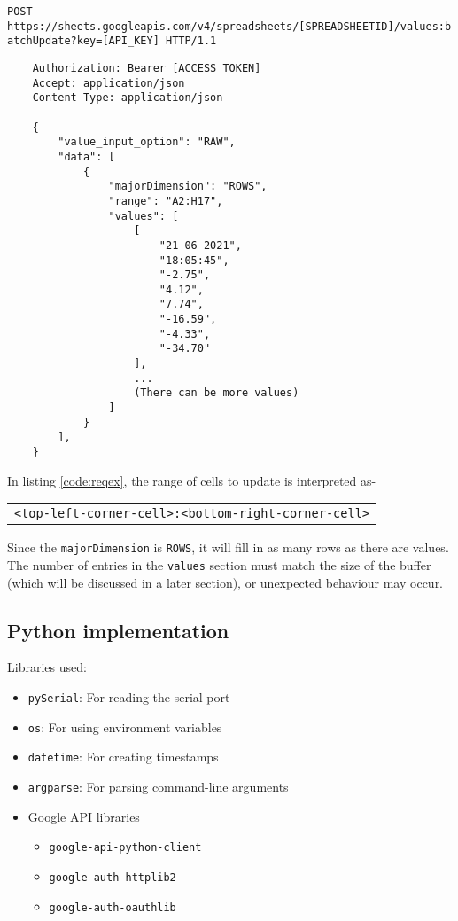 \documentclass[./RTPostureTrackingReport.tex]{subfiles}
\begin{document}
\begin{code}
    {\Smallfont \texttt{POST https://sheets.googleapis.com/v4/spreadsheets/[SPREADSHEETID]/values:batchUpdate?key=[API_KEY] HTTP/1.1}}
    \begin{verbatim}
    Authorization: Bearer [ACCESS_TOKEN]
    Accept: application/json
    Content-Type: application/json

    {
        "value_input_option": "RAW",
        "data": [
            {
                "majorDimension": "ROWS",
                "range": "A2:H17",
                "values": [
                    [
                        "21-06-2021",
                        "18:05:45",
                        "-2.75",
                        "4.12",
                        "7.74",
                        "-16.59",
                        "-4.33",
                        "-34.70"
                    ],
                    ...
                    (There can be more values)
                ]
            }
        ],
    }
    \end{verbatim}
    \label{code:reqex}
\end{code}
\vspace{0.5cm}

In listing \ref{code:reqex}, the range of cells to update is interpreted as-
\begin{code}
    \begin{table}[H]
        \centering
        \begin{tabular}{c}
        \texttt{<top-left-corner-cell>:<bottom-right-corner-cell>}
        \end{tabular}
    \end{table}
\end{code}
Since the \texttt{majorDimension} is \texttt{ROWS}, it will fill in as many
rows as there are values. The number of entries in the \texttt{values} section
must match the size of the buffer (which will be discussed in a later section),
or unexpected behaviour may occur.

\subsection{Python implementation}
Libraries used:
\begin{itemize}
    \item \texttt{pySerial}: For reading the serial port
    \item \texttt{os}: For using environment variables
    \item \texttt{datetime}: For creating timestamps
    \item \texttt{argparse}: For parsing command-line arguments
    \item Google API libraries
        \begin{itemize}
            \item \texttt{google-api-python-client}
            \item \texttt{google-auth-httplib2}
            \item \texttt{google-auth-oauthlib}
        \end{itemize}
\end{itemize}
\end{document}
